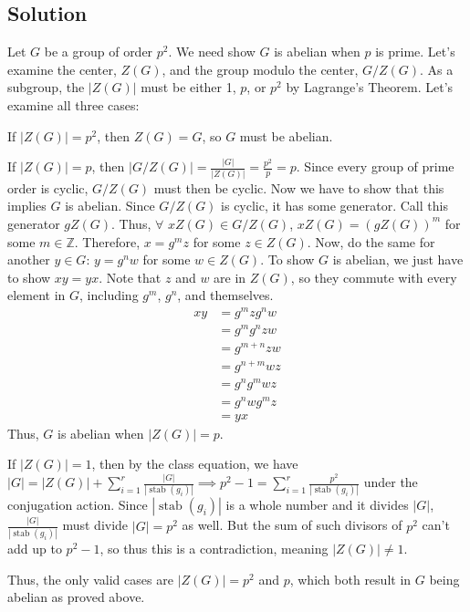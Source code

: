 \documentclass[fleqn]{article}
\DeclareMathOperator{\stab}{stab}
\begin{document}
        \subsection{Solution}
        Let $G$ be a group of order $p^2$.  We need show $G$ is abelian when $p$ is prime.  Let's examine the center, $Z(G)$, and the group modulo the center, $G/Z(G)$.  As a subgroup, the $|Z(G)|$ must be either 1, $p$, or $p^2$ by Lagrange's Theorem.  Let's examine all three cases:
        
        If $|Z(G)| = p^2$, then $Z(G) = G$, so $G$ must be abelian. 
        
        If $|Z(G)| = p$, then $|G/Z(G)| = \frac{|G|}{|Z(G)|} = \frac{p^2}{p} = p$.  Since every group of prime order is cyclic, $G/Z(G)$ must then be cyclic.  Now we have to show that this implies $G$ is abelian.  Since $G/Z(G)$ is cyclic, it has some generator.  Call this generator $gZ(G)$.  Thus, $\forall$ $xZ(G) \in G/Z(G)$, $xZ(G) = (gZ(G))^m$ for some $m \in \mathbb{Z}$.  Therefore, $x = g^mz$ for some $z \in Z(G)$.  Now, do the same for another $y \in G$: $y = g^nw$ for some $w \in Z(G)$.  To show $G$ is abelian, we just have to show $xy = yx$.  Note that $z$ and $w$ are in $Z(G)$, so they commute with every element in $G$, including $g^m$, $g^n$, and themselves.
        \begin{align}
            xy &= g^m z g^n w \\
                &= g^m g^n z w \\
                &= g^{m + n} z w \\
                &= g^{n + m} w z \\
                &= g^n g^m w z \\
                &= g^n w g^m z \\
                &= yx
        \end{align}
        Thus, $G$ is abelian when $|Z(G)| = p$.
        
        If $|Z(G)| = 1$, then by the class equation, we have $|G| = |Z(G)| + \sum\limits_{i = 1}^r \frac{|G|}{|\stab(g_i)|} \implies p^2 - 1 = \sum\limits_{i = 1}^r \frac{p^2}{|\stab(g_i)|}$ under the conjugation action.  Since $|\stab(g_i)|$ is a whole number and it divides $|G|$, $\frac{|G|}{|\stab(g_i)|}$ must divide $|G| = p^2$ as well.  But the sum of such divisors of $p^2$ can't add up to $p^2 - 1$, so thus this is a contradiction, meaning $|Z(G)| \neq 1$.
        
        Thus, the only valid cases are $|Z(G)| = p^2$ and $p$, which both result in $G$ being abelian as proved above.
    
\end{document}
